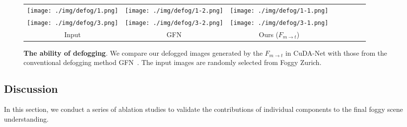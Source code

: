 \documentclass[10pt,twocolumn,letterpaper]{article}
\def\model{F}
\def\imd{m}
\def\td{t}
\begin{document}
\begin{table}[!t]
\begin{center}
\caption{\textbf{Different selection schemes for constructing $\imd$ domain.} We set three random seeds to ensure fair comparison and test the trained model on Foggy Zurich-test dataset.}
\label{tab:selection}
\vspace{-2mm}
\vspace{-6mm}
\end{center}
\end{table}

\begin{figure}[!ht]
\centering
		\tabcolsep=0.5pt
		\renewcommand\arraystretch{0.5}
		\begin{tabular}{cccccccc}
			\texttt{[image: ./img/defog/1.png]} &
			\texttt{[image: ./img/defog/1-2.png]} &
			\texttt{[image: ./img/defog/1-1.png]} 
			
			\\
\texttt{[image: ./img/defog/3.png]} &
			\texttt{[image: ./img/defog/3-2.png]} &
			\texttt{[image: ./img/defog/3-1.png]} 
			 \\
			Input & GFN &  Ours ($\model_{\imd \rightarrow \td}$) \\
	\end{tabular}
	\vspace{-2mm}
    \caption{\textbf{The ability of defogging}. We compare our defogged images generated by the $\model_{\imd \rightarrow \td}$ in CuDA-Net with those from the conventional defogging method GFN~\cite{ren2018gated}. The input images are randomly selected from {Foggy Zurich}.}
    \vspace{-4mm}
    \label{fig:defog}
\end{figure}

\subsection{Discussion}
In this section, we conduct a series of ablation studies to validate the contributions of individual components to the final foggy scene understanding. 
\end{document}
